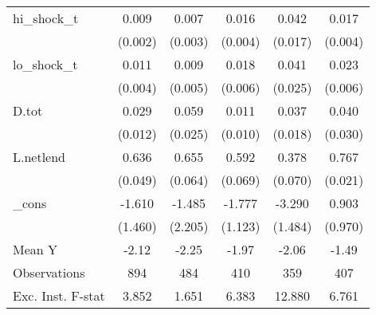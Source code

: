 {\begin{tabular}{l*{5}{c}}
\addlinespace
hi\_shock\_t  &       0.009\sym{***}&       0.007\sym{**} &       0.016\sym{***}&       0.042\sym{**} &       0.017\sym{***}\\
            &     (0.002)         &     (0.003)         &     (0.004)         &     (0.017)         &     (0.004)         \\
\addlinespace
lo\_shock\_t  &       0.011\sym{***}&       0.009\sym{*}  &       0.018\sym{***}&       0.041         &       0.023\sym{***}\\
            &     (0.004)         &     (0.005)         &     (0.006)         &     (0.025)         &     (0.006)         \\
\addlinespace
D.tot       &       0.029\sym{**} &       0.059\sym{**} &       0.011         &       0.037\sym{**} &       0.040         \\
            &     (0.012)         &     (0.025)         &     (0.010)         &     (0.018)         &     (0.030)         \\
\addlinespace
L.netlend   &       0.636\sym{***}&       0.655\sym{***}&       0.592\sym{***}&       0.378\sym{***}&       0.767\sym{***}\\
            &     (0.049)         &     (0.064)         &     (0.069)         &     (0.070)         &     (0.021)         \\
\addlinespace
\_cons      &      -1.610         &      -1.485         &      -1.777         &      -3.290\sym{**} &       0.903         \\
            &     (1.460)         &     (2.205)         &     (1.123)         &     (1.484)         &     (0.970)         \\
\midrule
Mean Y      &       -2.12         &       -2.25         &       -1.97         &       -2.06         &       -1.49         \\
Observations&         894         &         484         &         410         &         359         &         407         \\
Exc. Inst. F-stat&       3.852         &       1.651         &       6.383         &      12.880         &       6.761         \\
\bottomrule
\end{tabular}
}
